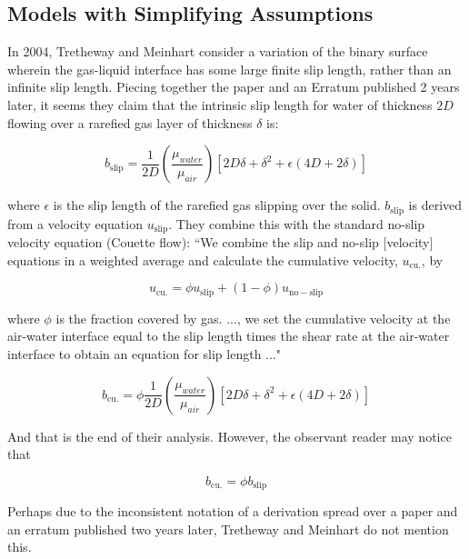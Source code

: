 \documentclass[a4paper]{report}
\begin{document}
\subsection*{Models with Simplifying Assumptions}

In 2004, Tretheway and Meinhart \cite{TrethewayMeinhart2004} consider a variation of the binary surface wherein the gas-liquid interface has some large finite slip length, rather than an infinite slip length.  Piecing together the paper and an Erratum \cite{TrethewayMeinhartErratum2004} published 2 years later, it seems they claim that the intrinsic slip length for water of thickness $2D$ flowing over a rarefied gas layer of thickness $\delta$ is:

\begin{equation*}
b_{\mathrm{slip}} = \frac{1}{2D} \left( \frac{\mu_{water}}{\mu_{air}} \right)
\left[ 2D\delta + \delta^2 + \epsilon(4D + 2\delta) \right]
\end{equation*}

where $\epsilon$ is the slip length of the rarefied gas slipping over the solid.  $b_{\mathrm{slip}}$ is derived from a velocity equation $u_{\mathrm{slip}}$.  They combine this with the standard no-slip velocity equation (Couette flow):
``We combine the slip and no-slip [velocity] equations in a weighted average and calculate the cumulative velocity, $u_{\mathrm{cu.}}$, by

\begin{equation*}
u_{\mathrm{cu.}} = \phi u_{\mathrm{slip}} + (1-\phi) u_{\mathrm{no-slip}}
\end{equation*}

where $\phi$ is the fraction covered by gas. ..., we set the cumulative velocity at the air-water interface equal to the slip length times the shear rate at the air-water interface to obtain an equation for slip length ..."

\begin{equation*}
b_{\mathrm{cu.}} = \phi \frac{1}{2D} \left( \frac{\mu_{water}}{\mu_{air}} \right)
 \left[ 2D\delta + \delta^2 + \epsilon(4D + 2\delta) \right]
\end{equation*}

And that is the end of their analysis.  However, the observant reader may notice that

\begin{equation*}
b_{\mathrm{cu.}} = \phi b_{\mathrm{slip}} 
\end{equation*}

Perhaps due to the inconsistent notation of a derivation spread over a paper and an erratum published two years later, Tretheway and Meinhart do not mention this.
\end{document}
